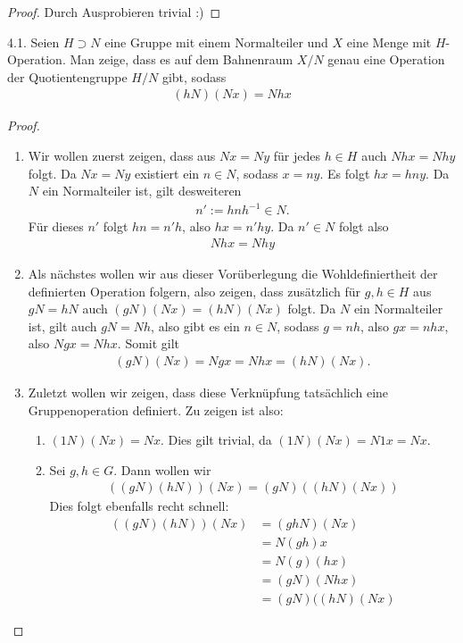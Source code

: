 \documentclass{article}
\newcommand{\ex}[1]{\tit{Übung} #1.}
\begin{document}
		\begin{proof}
			Durch Ausprobieren trivial :)
		\end{proof}
		\newpar
		\ex{4.1} Seien $H \supset N$ eine Gruppe mit einem Normalteiler und $X$ eine Menge mit $H$-Operation. Man zeige, dass es auf dem Bahnenraum $X/N$ genau eine Operation der Quotientengruppe $H/N$ gibt, sodass
		\begin{align*}
			(hN)(Nx) = Nhx
		\end{align*}
		\begin{proof}
			\begin{enumerate}
				\item 
					Wir wollen zuerst zeigen, dass aus $Nx = Ny$ für jedes $h \in H$ auch $Nhx = Nhy$ folgt.
					\newpar
					Da $Nx = Ny$ existiert ein $n \in N$, sodass $x = ny$. Es folgt $hx = hny$. Da $N$ ein Normalteiler ist, gilt desweiteren  
					\begin{align*}
						n' := hnh^{-1} \in N.
					\end{align*}
					Für dieses $n'$ folgt $hn = n'h$, also $hx = n'hy$. Da $n' \in N$ folgt also
					\begin{align*}
						Nhx = Nhy
					\end{align*}
				\item Als nächstes wollen wir aus dieser Vorüberlegung die Wohldefiniertheit der definierten Operation folgern, also zeigen, dass zusätzlich für $g,h \in H$ aus $gN = hN$ auch $(gN)(Nx) = (hN)(Nx)$ folgt.
				\newpar
				Da $N$ ein Normalteiler ist, gilt auch $gN = Nh$, also gibt es ein $n \in N$, sodass $g = nh$, also $gx = nhx$, also $Ngx = Nhx$. Somit gilt
				\begin{align*}
					(gN)(Nx) = Ngx = Nhx = (hN)(Nx).
				\end{align*}
				\item Zuletzt wollen wir zeigen, dass diese Verknüpfung tatsächlich eine Gruppenoperation definiert. Zu zeigen ist also:
				\begin{enumerate}
					\item $(1N)(Nx) = Nx$. Dies gilt trivial, da $(1N)(Nx) = N1x = Nx$.
					\item Sei $g,h \in G$. Dann wollen wir 
					\begin{align*}
						((gN)(hN))(Nx) = (gN)((hN)(Nx))
					\end{align*}
					Dies folgt ebenfalls recht schnell:
					\begin{align*}
						((gN)(hN))(Nx) 
						&= (ghN)(Nx)\\
						&= N(gh)x\\
						&= N(g)(hx)\\
						&= (gN)(Nhx)\\
						&= (gN)((hN)(Nx)
					\end{align*}
				\end{enumerate}
			\end{enumerate}
		\end{proof}
\end{document}
